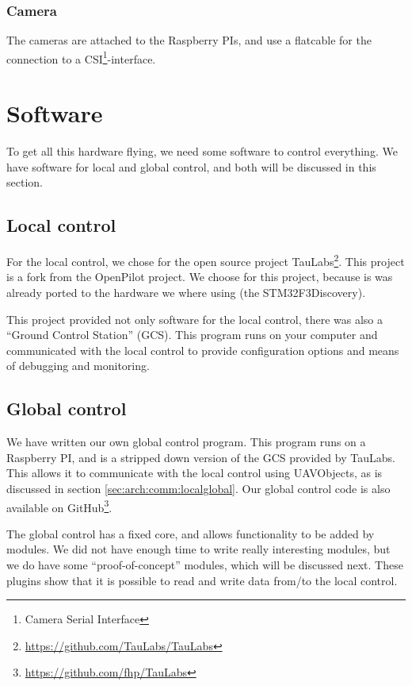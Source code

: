 \documentclass[11pt, a4paper, onecolumn, oneside, parskip=half]{scrartcl}
\begin{document}
\subsubsection{Camera}
\label{sec:arch:comm:camera}
The cameras are attached to the Raspberry PIs, and use a flatcable for the connection to a CSI\footnote{Camera Serial Interface}-interface.

\section{Software}
\label{sec:software}
To get all this hardware flying, we need some software to control everything. We have software for local and global control, and both will be discussed in this section.

\subsection{Local control}
\label{sec:software:local}
For the local control, we chose for the open source project TauLabs\footnote{\url{https://github.com/TauLabs/TauLabs}}. This project is a fork from the OpenPilot project. We choose for this project, because is was already ported to the hardware we where using (the STM32F3Discovery).

This project provided not only software for the local control, there was also a ``Ground Control Station'' (GCS). This program runs on your computer and communicated with the local control to provide configuration options and means of debugging and monitoring.

\subsection{Global control}
\label{sec:software:global}
We have written our own global control program. This program runs on a Raspberry PI, and is a stripped down version of the GCS provided by TauLabs. This allows it to communicate with the local control using UAVObjects, as is discussed in section \ref{sec:arch:comm:localglobal}. Our global control code is also available on GitHub\footnote{\url{https://github.com/fhp/TauLabs}}.

The global control has a fixed core, and allows functionality to be added by modules. We did not have enough time to write really interesting modules, but we do have some ``proof-of-concept'' modules, which will be discussed next. These plugins show that it is possible to read and write data from/to the local control.
\end{document}
